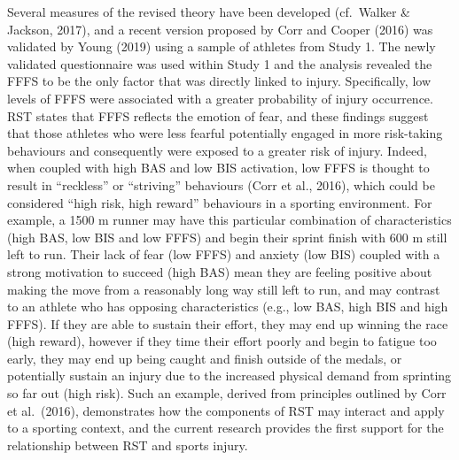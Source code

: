 \documentclass[
  english,
  man,floatsintext]{apa6}
\begin{document}
Several measures of the revised theory have been developed (cf.~Walker \& Jackson, 2017), and a recent version proposed by Corr and Cooper (2016) was validated by Young (2019) using a sample of athletes from Study 1.
The newly validated questionnaire was used within Study 1 and the analysis revealed the FFFS to be the only factor that was directly linked to injury.
Specifically, low levels of FFFS were associated with a greater probability of injury occurrence. RST states that FFFS reflects the emotion of fear, and these findings suggest that those athletes who were less fearful potentially engaged in more risk-taking behaviours and consequently were exposed to a greater risk of injury. Indeed, when coupled with high BAS and low BIS activation, low FFFS is thought to result in \enquote{reckless} or \enquote{striving} behaviours (Corr et al., 2016), which could be considered \enquote{high risk, high reward} behaviours in a sporting environment.
For example, a 1500 m runner may have this particular combination of characteristics (high BAS, low BIS and low FFFS) and begin their sprint finish with 600 m still left to run.
Their lack of fear (low FFFS) and anxiety (low BIS) coupled with a strong motivation to succeed (high BAS) mean they are feeling positive about making the move from a reasonably long way still left to run, and may contrast to an athlete who has opposing characteristics (e.g., low BAS, high BIS and high FFFS).
If they are able to sustain their effort, they may end up winning the race (high reward), however if they time their effort poorly and begin to fatigue too early, they may end up being caught and finish outside of the medals, or potentially sustain an injury due to the increased physical demand from sprinting so far out (high risk).
Such an example, derived from principles outlined by Corr et al.~(2016), demonstrates how the components of RST may interact and apply to a sporting context, and the current research provides the first support for the relationship between RST and sports injury.
\end{document}
